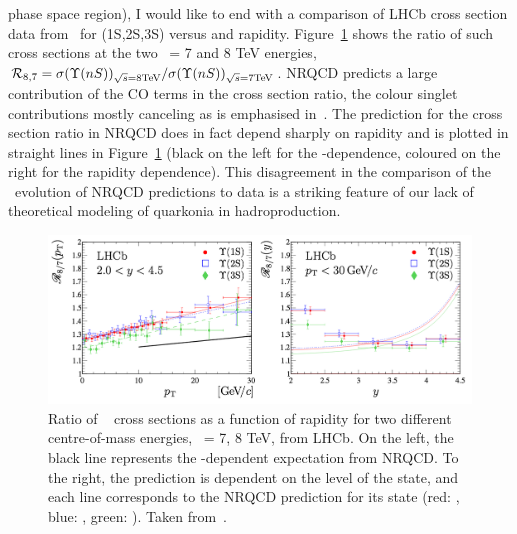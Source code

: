 phase space region), I would like to end with a comparison of LHCb
cross section data from~\cite{lhcbUpsi1fb} for \PgU(1S,2S,3S) versus
\pt and rapidity. Figure~\ref{fig:crosssectionratiolhcb} shows the
ratio of such cross sections at the two \s\ = 7 and 8
TeV energies, $\mathcal{R}_{8,7} = \sigma(\Upsilon(nS))_{\sqrt{s} = 8\textrm{TeV}}/\sigma(\Upsilon(nS))_{\sqrt{s} = 7\textrm{TeV}}$. NRQCD predicts a large contribution of the CO terms
in the cross section ratio, the colour singlet contributions mostly
canceling as is emphasised in~\cite{lhcbUpsi1fb}. The prediction for
the cross section ratio in NRQCD does in fact depend sharply on rapidity and is
plotted in straight lines in Figure~\ref{fig:crosssectionratiolhcb} (black on the left for the \pt-dependence,
coloured on the right for the rapidity dependence). This disagreement
in the comparison of the \s\ evolution of NRQCD predictions to data is
a striking feature of our lack of theoretical modeling of quarkonia in hadroproduction.



\begin{figure}[h]
\begin{center}
  \includegraphics[height=0.25\textheight]{Chapters/pQuarkonia/lhcbUpsiRapidityRatio.png}
  \caption{Ratio of \PgU~ cross sections as a function of rapidity for
    two different centre-of-mass energies, \s\ = 7, 8 TeV, from
    LHCb. On the left, the black line represents the \pt-dependent
    expectation from NRQCD. To the right, the prediction is dependent
    on the level of the state, and each line corresponds to the NRQCD
    prediction for its state (red: \PgUa, blue: \PgUb, green: \PgUc). Taken from~\cite{lhcbUpsi1fb}.}
  \label{fig:crosssectionratiolhcb}
\end{center}
\end{figure}


